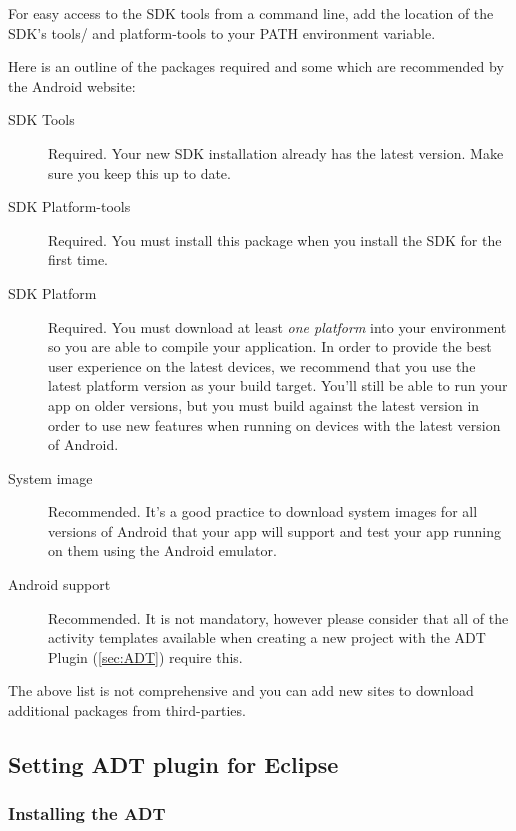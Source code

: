 \begin{remark}
   For easy access to the SDK tools from a command line, add the location
   of the SDK's tools/ and platform-tools to your PATH environment variable.
\end{remark}

Here is an outline of the packages required and some which are recommended by
the Android website:
\begin{description}
   \item[SDK Tools]
      Required. 
      Your new SDK installation already has the latest version. Make sure you
      keep this up to date.
   \item[SDK Platform-tools]
      Required. You must install this package when you install  the SDK for the
      first time. 
   \item[SDK Platform]
      Required.
      You must download at least \emph{one platform} into your environment so
      you are able to compile your application.
      In order to provide the best user experience on the latest devices, we
      recommend that you use the latest platform version as your build target.
      You'll still be able to run your app on older versions, but you must
      build against the latest version in order to use new features when
      running on devices with the latest version of Android.
   \item[System image]
      Recommended.
      It's a good practice to download system images for all versions of
      Android that your app will support and test your app running on
      them using the Android emulator.
   \item[Android support]
      Recommended.
      It is not mandatory, however please consider that all of the activity
      templates available when creating a new project with the ADT Plugin
      (\cref{sec:ADT}) require this.
\end{description}

The above list is not comprehensive and you can add new sites to download
additional packages from third-parties.

\subsection{Setting ADT plugin for Eclipse\label{sec:ADT}}

\subsubsection{Installing the ADT}

